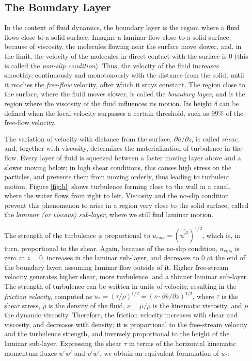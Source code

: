 \documentclass[a4paper,11pt]{kth-mag}
\begin{document}
\subsection{The Boundary Layer}
In the context of fluid dynamics, the boundary layer is the region where a fluid flows close to a solid surface. Imagine a laminar flow close to a solid surface; because of viscosity, the molecules flowing near the surface move slower, and, in the limit, the velocity of the molecules in direct contact with the surface is 0 (this is called the \emph{non-slip condition}). Thus, the velocity of the fluid increases smoothly, continuously and monotonously with the distance from the solid, until it reaches the \emph{free-flow} velocity, after which it stays constant. The region close to the surface, where the fluid moves slower, is called the \emph{boundary layer}, and is the region where the viscosity of the fluid influences its motion. Its height $\delta$ can be defined when the local velocity surpasses a certain threshold, such as 99\% of the free-flow velocity.

The variation of velocity with distance from the surface, $\partial\overline{u}/\partial z$, is called \emph{shear}, and, together with viscosity, determines the materialization of turbulence in the flow. Every layer of fluid is squeezed between a faster moving layer above and a slower moving below; in high shear conditions, this causes high stress on the particles, and prevents them from moving orderly, thus leading to turbulent motion. Figure \ref{fig:bl} shows turbulence forming close to the wall in a canal, where the water flows from right to left. Viscosity and the no-slip condition prevent this phenomenon to arise in a region very close to the solid surface, called the \emph{laminar (or viscous) sub-layer}, where we still find laminar motion.

The strength of the turbulence is proportional to $u_{rms}=(\overline{u'^2})^{1/2}$, which is, in turn, proportional to the shear. Again, because of the no-slip condition, $u_{rms}$ is zero at $z=0$, increases in the laminar sub-layer, and decreases to 0 at the end of the boundary layer, assuming laminar flow outside of it. Higher free-stream velocity generates higher shear, more turbulence, and a thinner laminar sub-layer. The strength of turbulence can be written in units of velocity, resulting in the \emph{friction velocity}, computed as $u_*=(\tau/\rho)^{1/2}=(\nu\cdot\partial\overline{u}/\partial z)^{1/2}$, where $\tau$ is the shear stress, $\rho$ is the density of the fluid, $\nu=\mu/\rho$ is the kinematic viscosity, and $\mu$ the dynamic viscosity. Therefore, the friction velocity increases with shear and viscosity, and decreases with density; it is proportional to the free-stream velocity and the turbulence strength, and inversely proportional to the height of the laminar sub-layer. Expressing the shear $\tau$ in terms of the horizontal kinematic momentum fluxes $\overline{u'w'}$ and $\overline{v'w'}$, we obtain an equivalent formulation of $u_*$:
\end{document}
